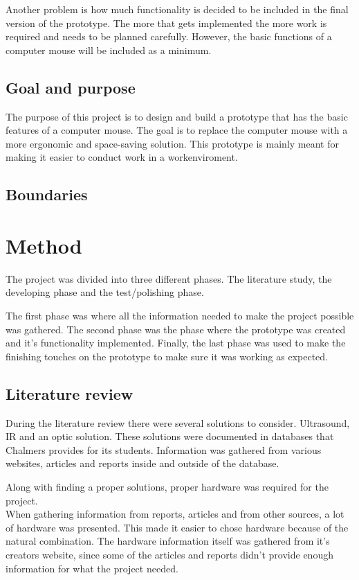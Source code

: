 \documentclass[a4paper,11pt]{article}
\begin{document}
Another problem is how much functionality is decided to be included in the final 
version of the prototype. The more that gets implemented the more work is required
and needs to be planned carefully. However, the basic functions of a computer mouse will be 
included as a minimum.

\subsection{Goal and purpose}
The purpose of this project is to design and build a prototype that has the basic features of 
a computer mouse. The goal is to replace the computer mouse with a more ergonomic and space-saving
solution. This prototype is mainly meant for making it easier to conduct work in a workenviroment.

\subsection{Boundaries}

\newpage

\section{Method}
The project was divided into three different phases. The literature study, the developing phase and the test/polishing phase.

The first phase was where all the information needed to make the project possible was gathered.
The second phase was the phase where the prototype was created and it's functionality implemented.
Finally, the last phase was used to make the finishing touches on the prototype to make sure it
was working as expected.

\subsection{Literature review}
During the literature review there were several solutions to consider. Ultrasound, IR and an optic
solution. These solutions were documented in databases that Chalmers provides for its students.
Information was gathered from various websites, articles and reports inside and outside of the
database.

Along with finding a proper solutions, proper hardware was required for the project.\\
When gathering information from reports, articles and from other sources, a lot of hardware was
presented. This made it easier to chose hardware because of the natural combination. The hardware
information itself was gathered from it's creators website, since some of the articles and reports
didn't provide enough information for what the project needed.
\end{document}
